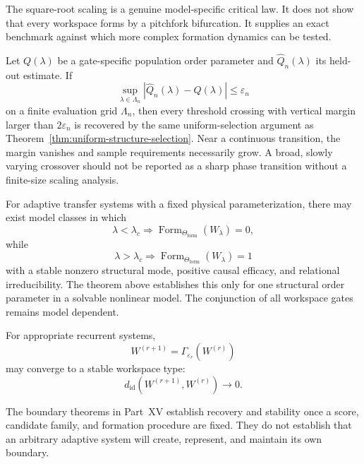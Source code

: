 The square-root scaling is a genuine model-specific critical law. It does not
show that every workspace forms by a pitchfork bifurcation. It supplies an
exact benchmark against which more complex formation dynamics can be tested.


Let \(Q(\lambda)\) be a gate-specific population order parameter and
\(\widehat Q_n(\lambda)\) its held-out estimate. If
\[
\sup_{\lambda\in\Lambda_n}
|\widehat Q_n(\lambda)-Q(\lambda)|
\leq\varepsilon_n
\]
on a finite evaluation grid \(\Lambda_n\), then every threshold crossing with
vertical margin larger than \(2\varepsilon_n\) is recovered by the same
uniform-selection argument as Theorem~\ref{thm:uniform-structure-selection}.
Near a continuous transition, the margin vanishes and sample requirements
necessarily grow. A broad, slowly varying crossover should not be reported as
a sharp phase transition without a finite-size scaling analysis.


For adaptive transfer systems with a fixed physical parameterization, there
may exist model classes in which
\[
\lambda<\lambda_c
\Longrightarrow
\operatorname{Form}_{\Theta_{\mathrm{form}}}(W_\lambda)=0,
\]
while
\[
\lambda>\lambda_c
\Longrightarrow
\operatorname{Form}_{\Theta_{\mathrm{form}}}(W_\lambda)=1
\]
with a stable nonzero structural mode, positive causal efficacy, and
relational irreducibility. The theorem above establishes this only for one
structural order parameter in a solvable nonlinear model. The conjunction of
all workspace gates remains model dependent.



For appropriate recurrent systems,
\[
W^{(r+1)}
=
\Gamma_{\varepsilon_r}(W^{(r)})
\]
may converge to a stable workspace type:
\[
d_{\mathrm{id}}\!\left(
W^{(r+1)},W^{(r)}
\right)
\to0.
\]


The boundary theorems in Part~XV establish recovery and stability once a score,
candidate family, and formation procedure are fixed. They do not establish
that an arbitrary adaptive system will create, represent, and maintain its own
boundary.

